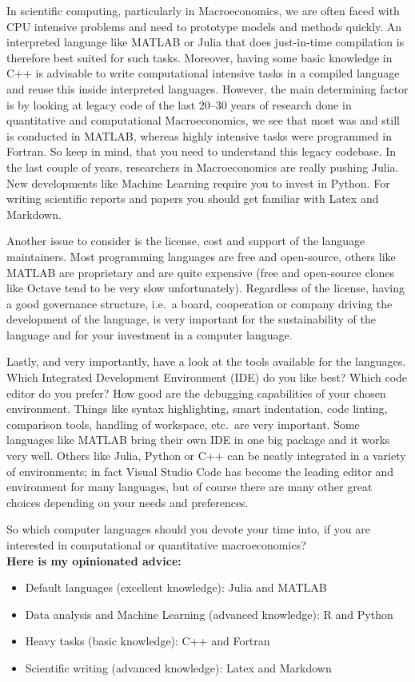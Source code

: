 \begin{enumerate}
In scientific computing, particularly in Macroeconomics,
  we are often faced with CPU intensive problems
  and need to prototype models and methods quickly.
An interpreted language like MATLAB or Julia that does just-in-time compilation
  is therefore best suited for such tasks.
Moreover, having some basic knowledge in C++ is advisable
  to write computational intensive tasks in a compiled language
  and reuse this inside interpreted languages.
However, the main determining factor is by looking at legacy code of the last 20--30 years of research done
  in quantitative and computational Macroeconomics,
  we see that most was and still is conducted in MATLAB,
  whereas highly intensive tasks were programmed in Fortran.
So keep in mind, that you need to understand this legacy codebase.
In the last couple of years, researchers in Macroeconomics are really pushing Julia.
New developments like Machine Learning require you to invest in Python.
For writing scientific reports and papers you should get familiar with Latex and Markdown.

Another issue to consider is the license, cost and support of the language maintainers.
Most programming languages are free and open-source,
  others like MATLAB are proprietary and are quite expensive
  (free and open-source clones like Octave tend to be very slow unfortunately).
Regardless of the license, having a good governance structure,
  i.e.\ a board, cooperation or company driving the development of the language,
  is very important for the sustainability of the language
  and for your investment in a computer language.

Lastly, and very importantly, have a look at the tools available for the languages.
Which Integrated Development Environment (IDE) do you like best?
Which code editor do you prefer?
How good are the debugging capabilities of your chosen environment.
Things like syntax highlighting, smart indentation, code linting, comparison tools,
  handling of workspace, etc.\ are very important.
Some languages like MATLAB bring their own IDE in one big package and it works very well.
Others like Julia, Python or C++ can be neatly integrated in a variety of environments;
  in fact Visual Studio Code has become the leading editor and environment for many languages,
  but of course there are many other great choices depending on your needs and preferences.

So which computer languages should you devote your time into,
  if you are interested in computational or quantitative macroeconomics?
\\
\textbf{Here is my opinionated advice:}
\begin{itemize}
\item Default languages (excellent knowledge): Julia and MATLAB
\item Data analysis and Machine Learning (advanced knowledge): R and Python
\item Heavy tasks (basic knowledge): C++ and Fortran
\item Scientific writing (advanced knowledge): Latex and Markdown
\end{itemize}

\end{enumerate}